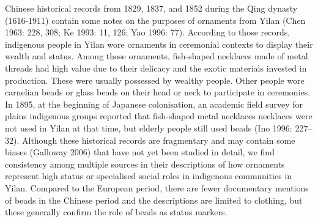 \documentclass[]{article}
\begin{document}
Chinese historical records from 1829, 1837, and 1852 during the Qing
dynasty (1616-1911) contain some notes on the purposes of ornaments from
Yilan (Chen 1963: 228, 308; Ke 1993: 11, 126; Yao 1996: 77). According
to those records, indigenous people in Yilan wore ornaments in
ceremonial contexts to display their wealth and status. Among those
ornaments, fish-shaped necklaces made of metal threads had high value
due to their delicacy and the exotic materials invested in production.
These were usually possessed by wealthy people. Other people wore
carnelian beads or glass beads on their head or neck to participate in
ceremonies. In 1895, at the beginning of Japanese colonisation, an
academic field survey for plains indigenous groups reported that
fish-shaped metal necklaces necklaces were not used in Yilan at that
time, but elderly people still used beads (Ino 1996: 227--32). Although
these historical records are fragmentary and may contain some biases
(Galloway 2006) that have not yet been studied in detail, we find
consistency among multiple sources in their descriptions of how
ornaments represent high status or specialised social roles in
indigenous communities in Yilan. Compared to the European period, there
are fewer documentary mentions of beads in the Chinese period and the
descriptions are limited to clothing, but these generally confirm the
role of beads as status markers.
\end{document}
